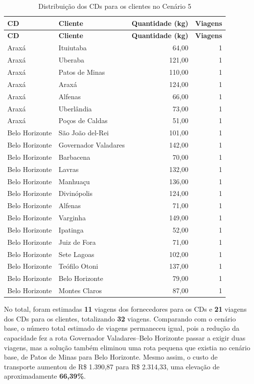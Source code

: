 \documentclass[a4paper,11pt]{article}
\begin{document}
{\footnotesize
\begin{longtable}{p{3.3cm}p{4.0cm}rr}
\caption{Distribuição dos CDs para os clientes no Cenário 5}\label{tab:cenario5_cd_cliente}\\
\hline
\textbf{CD} & \textbf{Cliente} & \textbf{Quantidade (kg)} & \textbf{Viagens} \\ \hline
\endfirsthead
\hline
\textbf{CD} & \textbf{Cliente} & \textbf{Quantidade (kg)} & \textbf{Viagens} \\ \hline
\endhead
Araxá & Ituiutaba & 64,00 & 1 \\
Araxá & Uberaba & 121,00 & 1 \\
Araxá & Patos de Minas & 110,00 & 1 \\
Araxá & Araxá & 124,00 & 1 \\
Araxá & Alfenas & 66,00 & 1 \\
Araxá & Uberlândia & 73,00 & 1 \\
Araxá & Poços de Caldas & 51,00 & 1 \\
Belo Horizonte & São João del-Rei & 101,00 & 1 \\
Belo Horizonte & Governador Valadares & 142,00 & 1 \\
Belo Horizonte & Barbacena & 70,00 & 1 \\
Belo Horizonte & Lavras & 132,00 & 1 \\
Belo Horizonte & Manhuaçu & 136,00 & 1 \\
Belo Horizonte & Divinópolis & 124,00 & 1 \\
Belo Horizonte & Alfenas & 71,00 & 1 \\
Belo Horizonte & Varginha & 149,00 & 1 \\
Belo Horizonte & Ipatinga & 52,00 & 1 \\
Belo Horizonte & Juiz de Fora & 71,00 & 1 \\
Belo Horizonte & Sete Lagoas & 102,00 & 1 \\
Belo Horizonte & Teófilo Otoni & 137,00 & 1 \\
Belo Horizonte & Belo Horizonte & 79,00 & 1 \\
Belo Horizonte & Montes Claros & 87,00 & 1 \\ \hline
\end{longtable}
}

No total, foram estimadas \textbf{11} viagens dos fornecedores para os CDs e \textbf{21} viagens dos CDs para os clientes, totalizando \textbf{32} viagens. Comparando com o cenário base, o número total estimado de viagens permaneceu igual, pois a redução da capacidade fez a rota Governador Valadares--Belo Horizonte passar a exigir duas viagens, mas a solução também eliminou uma rota pequena que existia no cenário base, de Patos de Minas para Belo Horizonte. Mesmo assim, o custo de transporte aumentou de R\$ 1.390,87 para R\$ 2.314,33, uma elevação de aproximadamente \textbf{66,39\%}.
\end{document}
